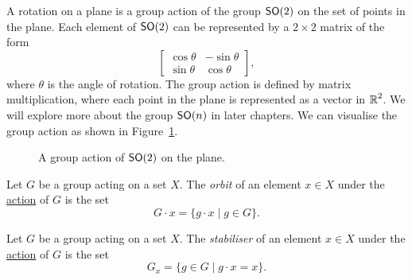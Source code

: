 A rotation on a plane is a group action of the group $\operatorname{\text{\normalfont\sffamily SO}}(2)$ on the set of points in the plane. Each element of $\operatorname{\text{\normalfont\sffamily SO}}(2)$ can be represented by a $2 \times 2$ matrix of the form
\[
  \begin{bmatrix}
    \cos \theta & -\sin \theta \\
    \sin \theta & \cos \theta
  \end{bmatrix},
\]
where $\theta$ is the angle of rotation. The group action is defined by matrix multiplication, where each point in the plane is represented as a vector in $\operatorname{\mathbb{R}}^2$. We will explore more about the group $\operatorname{\text{\normalfont\sffamily SO}}(n)$ in later chapters. We can visualise the group action as shown in Figure~\ref{fig:group_action}.
\begin{figure}[ht!]
  \caption{A group action of $\operatorname{\text{\normalfont\sffamily SO}}(2)$ on the plane.}\label{fig:group_action}
\end{figure}

\begin{definition}[Orbits]\label{def:orbits}
  Let $G$ be a group acting on a set $X$. The \emph{orbit} of an element $x \in X$ under the \hyperref[def:group_action]{action} of $G$ is the set
  \[
    G \cdot x = \{ g \cdot x \mid g \in G \}.
  \]
\end{definition}

\begin{definition}[Stabiliser]\label{def:stabiliser}
  Let $G$ be a group acting on a set $X$. The \emph{stabiliser} of an element $x \in X$ under the \hyperref[def:group_action]{action} of $G$ is the set
  \[
    G_x = \{ g \in G \mid g \cdot x = x \}.
  \]
\end{definition}

